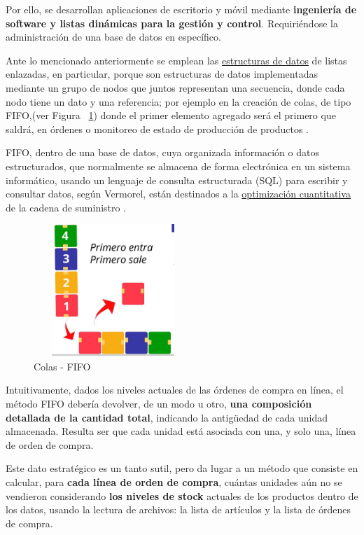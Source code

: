 \documentclass[10pt,journal]{IEEEtran}
\begin{document}
\begin{enumerate}
    Por ello, se desarrollan aplicaciones de escritorio y móvil mediante \textbf{ingeniería de software y listas dinámicas para la gestión y control}. Requiriéndose la administración de una base de datos en específico.
    
    Ante lo mencionado anteriormente se emplean las \underline{estructuras de datos} de listas enlazadas, en particular, porque son estructuras de datos implementadas mediante un grupo de nodos que juntos representan una secuencia, donde cada nodo tiene un dato y una referencia; por ejemplo en la creación de colas, de tipo FIFO,(ver Figura ~\ref{f77}) donde el primer elemento agregado será el primero que saldrá, en órdenes o monitoreo de estado de producción de productos \cite{leon2019desarrollo}.
    
    FIFO, dentro de una base de datos, cuya organizada información o datos estructurados, que normalmente se almacena de forma electrónica en un sistema informático, usando un lenguaje de consulta estructurada (SQL) para escribir y consultar datos, según Vermorel, están destinados a la \underline{optimización cuantitativa} de la cadena de suministro \cite{d}. 
    
     \begin{figure}[H]
        \begin{center}
        \includegraphics[width=6cm, height=5cm]{Imagenes/FIFO.jpg}
        \caption{Colas - FIFO}
        \label{f77} 
        \end{center}
    \end{figure}
    
    Intuitivamente, dados los niveles actuales de las órdenes de compra en línea, el método FIFO debería devolver, de un modo u otro, \textbf{una composición detallada de la cantidad total}, indicando la antigüedad de cada unidad almacenada. Resulta ser que cada unidad está asociada con una, y solo una, línea de orden de compra.
    
    Este dato estratégico es un tanto sutil, pero da lugar a un método que consiste en calcular, para \textbf{cada línea de orden de compra}, cuántas unidades aún no se vendieron considerando \textbf{los niveles de stock} actuales de los productos dentro de los datos, usando la lectura de archivos: la lista de artículos y la lista de órdenes de compra.
    \end{enumerate}
    
\end{document}
